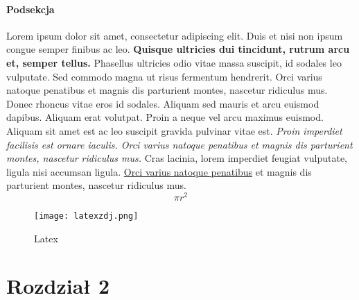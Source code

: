 \documentclass[12pt,a4paper]{article}
\begin{document}
	\subsection{Podsekcja}
	\label{Podsekcja}
	Lorem ipsum dolor sit amet, consectetur adipiscing elit. Duis et nisi non ipsum congue semper finibus ac leo. \textbf{Quisque ultricies dui tincidunt, rutrum arcu et, semper tellus.} Phasellus ultricies odio vitae massa suscipit, id sodales leo vulputate. Sed commodo magna ut risus fermentum hendrerit. Orci varius natoque penatibus et magnis dis parturient montes, nascetur ridiculus mus. Donec rhoncus vitae eros id sodales. \cite{ref2}Aliquam sed mauris et arcu euismod dapibus. Aliquam erat volutpat. Proin a neque vel arcu maximus euismod. Aliquam sit amet est ac leo suscipit gravida pulvinar vitae est. \textit{Proin imperdiet facilisis est ornare iaculis. Orci varius natoque penatibus et magnis dis parturient montes, nascetur ridiculus mus.} Cras lacinia, lorem imperdiet feugiat vulputate, ligula nisi accumsan ligula.  \underline{Orci varius natoque penatibus} et magnis dis parturient montes, nascetur ridiculus mus.
 $$
        \pi r^2
    $$
	\begin{figure}[H]
		\centering
		\texttt{[image: latexzdj.png]}
		\caption{Latex}
		\label{fig: Latex}
	\end{figure}
	
	\part{Rozdział 2}
\end{document}

